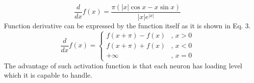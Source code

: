 \documentclass{llncs}
\begin{document}
\FloatBarrier
%
\begin{equation}
\frac{d}{dx}f(x) = \frac {\pi (|x|\cos x - x\sin x)} { |x| e^{ |x| } }
\end{equation}
%
Function derivative can be expressed by the function itself as it is shown in Eq. 3.
%
\begin{equation}
\frac{d}{dx}f(x) = 
\left\{
	\begin{array}{ll}
		f(x + \pi) - f(x) & \mbox{, } x > 0 \\
		f(x + \pi) + f(x) & \mbox{, } x < 0 \\
		+\infty & \mbox{, } x = 0
	\end{array}
\right.
\end{equation}
%
The advantage of such activation function is that each neuron has loading level which it is capable to handle. 
\end{document}
